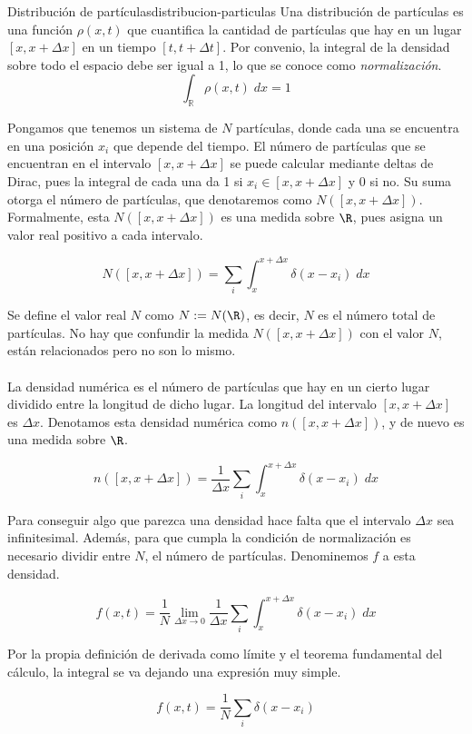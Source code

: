 \begin{definicion}{Distribución de partículas}{distribucion-particulas}
Una distribución de partículas es una función $\rho(x,t)$ que cuantifica la cantidad de partículas que hay en un lugar $[x,x+\Delta x]$ en un tiempo $[t,t+\Delta t]$. Por convenio, la integral de la densidad sobre todo el espacio debe ser igual a 1, lo que se conoce como \textit{normalización}.
\[\int_\mathbb R\rho(x,t)\;dx=1\]
\end{definicion}

Pongamos que tenemos un sistema de $N$ partículas, donde cada una se encuentra en una posición $x_i$ que depende del tiempo. El número de partículas que se encuentran en el intervalo $[x,x+\Delta x]$ se puede calcular mediante deltas de Dirac, pues la integral de cada una da 1 si $x_i\in[x,x+\Delta x]$ y 0 si no. Su suma otorga el número de partículas, que denotaremos como $N([x,x+\Delta x])$. Formalmente, esta $N([x,x+\Delta x])$ es una medida sobre $\R$, pues asigna un valor real positivo a cada intervalo.

\[N([x,x+\Delta x])=\sum_i\int_{x}^{x+\Delta x}\delta(x-x_i)\;dx\]

Se define el valor real $N$ como $N:=N(\R)$, es decir, $N$ es el número total de partículas. No hay que confundir la medida $N([x,x+\Delta x])$ con el valor $N$, están relacionados pero no son lo mismo.
\\\\
La densidad numérica es el número de partículas que hay en un cierto lugar dividido entre la longitud de dicho lugar. La longitud del intervalo $[x,x+\Delta x]$ es $\Delta x$. Denotamos esta densidad numérica como $n([x,x+\Delta x])$, y de nuevo es una medida sobre $\R$.

\[n([x,x+\Delta x])=\frac1{\Delta x}\sum_i\int_{x}^{x+\Delta x}\delta(x-x_i) \;dx\]

Para conseguir algo que parezca una densidad hace falta que el intervalo $\Delta x$ sea infinitesimal. Además, para que cumpla la condición de normalización es necesario dividir entre $N$, el número de partículas. Denominemos $f$ a esta densidad.

\[f(x,t)=\frac1N\lim_{\Delta x\to0}\frac1{\Delta x}\sum_i\int_{x}^{x+\Delta x}\delta(x-x_i) \;dx\]

Por la propia definición de derivada como límite y el teorema fundamental del cálculo, la integral se va dejando una expresión muy simple. 

\begin{equation}
    f(x,t)=\frac1N\sum_i\delta(x-x_i)
    \label{eq:densidad_N_finito}
\end{equation}

